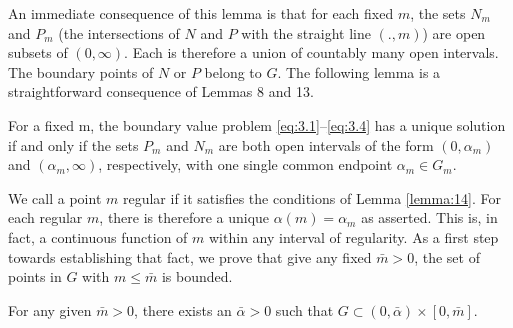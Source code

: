 An immediate consequence of this lemma is that for each fixed $m$,
the sets $N_m$ and $P_m$ (the intersections of $N$ and $P$ with 
the straight line $(., m)$) are open subsets of $(0, \infty)$. 
Each is therefore a union of countably many open intervals.
The boundary points of $N$ or $P$ belong to $G$.
The following lemma is a straightforward consequence of Lemmas 8 and 13.

\begin{lemma}\label{lemma:14}
  For a fixed m, the boundary value problem \eqref{eq:3.1}--\eqref{eq:3.4}
  has a unique solution if and only if
  the sets $P_m$ and $N_m$ are both open intervals of the form $\left(0, \alpha_m\right)$ and
  $\left(\alpha_m, \infty\right)$, respectively,
  with one single common endpoint $\alpha_m \in G_m$.
\end{lemma}

We call a point $m$ regular if it satisfies the conditions of Lemma \ref{lemma:14}.
For each regular $m$, there is therefore a unique $\alpha(m)=\alpha_m$ as asserted.
This is, in fact, a continuous function of $m$ within any interval of regularity.
As a first step towards establishing that fact, we prove that give any fixed $\bar{m}>0$,
the set of points in $G$ with $m \leq \bar{m}$ is bounded.

\begin{lemma}\label{lemma:15}
  For any given $\bar{m}>0$, there exists an $\bar{\alpha}>0$
  such that $G\subset (0, \bar{\alpha})\times[0, \bar{m}]$.
\end{lemma}

